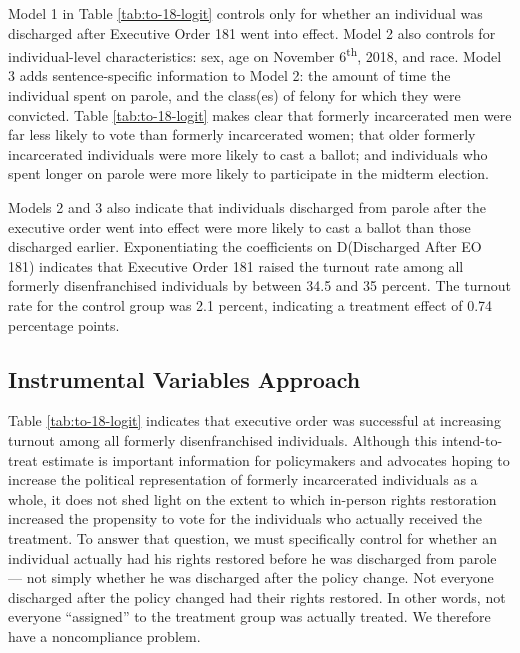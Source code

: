 \documentclass[
  12pt,
]{article}
\begin{document}
\begin{singlespace}


\end{singlespace}

Model 1 in Table \ref{tab:to-18-logit} controls only for whether an individual was discharged after Executive Order 181 went into effect. Model 2 also controls for individual-level characteristics: sex, age on November 6\textsuperscript{th}, 2018, and race. Model 3 adds sentence-specific information to Model 2: the amount of time the individual spent on parole, and the class(es) of felony for which they were convicted. Table \ref{tab:to-18-logit} makes clear that formerly incarcerated men were far less likely to vote than formerly incarcerated women; that older formerly incarcerated individuals were more likely to cast a ballot; and individuals who spent longer on parole were more likely to participate in the midterm election.

Models 2 and 3 also indicate that individuals discharged from parole after the executive order went into effect were more likely to cast a ballot than those discharged earlier. Exponentiating the coefficients on D(Discharged After EO 181) indicates that Executive Order 181 raised the turnout rate among all formerly disenfranchised individuals by between 34.5 and 35 percent. The turnout rate for the control group was 2.1 percent, indicating a treatment effect of 0.74 percentage points.

\hypertarget{instrumental-variables-approach}{%
\subsection*{Instrumental Variables Approach}\label{instrumental-variables-approach}}

Table \ref{tab:to-18-logit} indicates that executive order was successful at increasing turnout among all formerly disenfranchised individuals. Although this intend-to-treat estimate is important information for policymakers and advocates hoping to increase the political representation of formerly incarcerated individuals as a whole, it does not shed light on the extent to which in-person rights restoration increased the propensity to vote for the individuals who actually received the treatment. To answer that question, we must specifically control for whether an individual actually had his rights restored before he was discharged from parole --- not simply whether he was discharged after the policy change. Not everyone discharged after the policy changed had their rights restored. In other words, not everyone ``assigned'' to the treatment group was actually treated. We therefore have a noncompliance problem.
\end{document}
